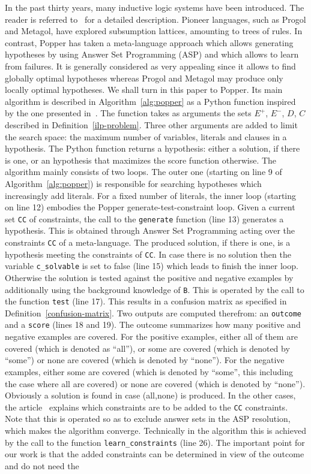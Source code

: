 In the past thirty years, many inductive logic 
systems have been introduced. The reader is referred to~\cite{cropper2022inductive} for a detailed description. 
Pioneer languages, such as Progol and Metagol, have explored subsumption lattices, amounting to trees of rules. In contrast, Popper has taken a meta-language approach which allows generating hypotheses by using Answer Set Programming (ASP) and which allows to learn from failures. It is generally considered as very appealing since it allows to find globally optimal hypotheses whereas Progol and Metagol may produce only locally optimal hypotheses. We shall turn in this paper to Popper. Its main algorithm is described in Algorithm~\ref{alg:popper} as a Python function inspired by the one presented in~\cite{cropper2021learning}. The function takes as arguments the sets $E^+$, $E^-$, $D$, $C$ described in Definition~\ref{ilp-problem}. Three other arguments are added to limit the search space: the maximum number of variables, literals and clauses in a hypothesis. The Python function returns a hypothesis: either a solution, if there is one, or an hypothesis that maximizes the score function otherwise. The algorithm mainly consists of two loops. The outer one (starting on line 9 of Algorithm~\ref{alg:popper}) is responsible for searching hypotheses which increasingly add literals. For a fixed number of literals, the inner loop (starting on line 12) embodies the Popper generate-test-constraint loop. Given a current set \texttt{CC} of constraints, the call to the \texttt{generate} function (line 13) generates a hypothesis. This is obtained through Answer Set Programming acting over the constraints \texttt{CC} of a meta-language. The produced solution, if there is one, is a hypothesis meeting the constraints of \texttt{CC}. In case there is no solution then the variable \texttt{c\_solvable} is set to false (line 15) which leads to finish the inner loop. Otherwise the solution is tested against the positive and negative examples by additionally using the background knowledge of \texttt{B}. This is operated by the call to the function \texttt{test} (line 17). This results in a confusion matrix as specified in Definition~\ref{confusion-matrix}. Two outputs are computed therefrom: an \texttt{outcome} and a \texttt{score} (lines 18 and 19). The outcome summarizes how many positive and negative examples are covered. For the positive examples, either all of them are covered (which is denoted as ``all''), or  some are covered (which is denoted by ``some'') or none are covered (which is denoted by ``none''). For the negative examples, either some are covered (which is denoted by ``some'', this including the case where all are covered) or none are covered (which is denoted by ``none''). Obviously a solution is found in case (all,none) is produced. In the other cases, the article~\cite{cropper2021learning} explains which constraints are to be added to the \texttt{CC} constraints. Note that this is operated so as to exclude answer sets in the ASP resolution, which makes the algorithm converge. Technically in the algorithm this is achieved by the call to the function \texttt{learn\_constraints} (line 26). The important point for our work is that the added constraints can be determined in view of the outcome and do not need the 